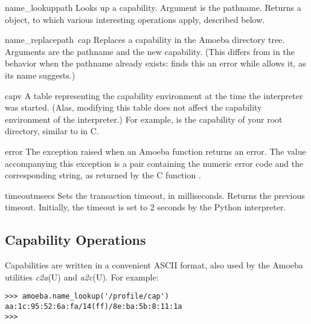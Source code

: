\begin{funcdesc}{name_lookup}{path}
Looks up a capability.
Argument is the pathname.
Returns a
object, to which various interesting operations apply, described below.
\end{funcdesc}

\begin{funcdesc}{name_replace}{path\, cap}
Replaces a capability in the Amoeba directory tree.
Arguments are the pathname and the new capability.
(This differs from
in the behavior when the pathname already exists:
finds this an error while
allows it, as its name suggests.)
\end{funcdesc}

\begin{datadesc}{capv}
A table representing the capability environment at the time the
interpreter was started.
(Alas, modifying this table does not affect the capability environment
of the interpreter.)
For example,
is the capability of your root directory, similar to
in C.
\end{datadesc}

\begin{excdesc}{error}
The exception raised when an Amoeba function returns an error.
The value accompanying this exception is a pair containing the numeric
error code and the corresponding string, as returned by the C function
.
\end{excdesc}

\begin{funcdesc}{timeout}{msecs}
Sets the transaction timeout, in milliseconds.
Returns the previous timeout.
Initially, the timeout is set to 2 seconds by the Python interpreter.
\end{funcdesc}

\subsection{Capability Operations}

Capabilities are written in a convenient ASCII format, also used by the
Amoeba utilities
{\it c2a}(U)
and
{\it a2c}(U).
For example:

\bcode\begin{verbatim}
>>> amoeba.name_lookup('/profile/cap')
aa:1c:95:52:6a:fa/14(ff)/8e:ba:5b:8:11:1a
>>> 
\end{verbatim}\ecode

